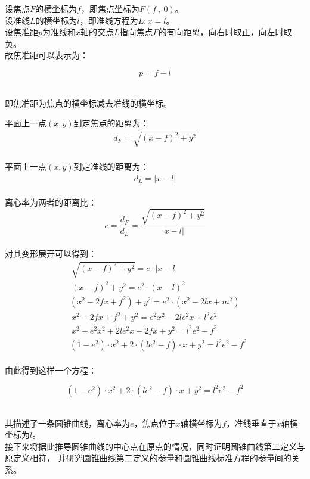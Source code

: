 \documentclass[UTF8]{ctexart}
\begin{document}
    设焦点$F$的横坐标为$f$，即焦点坐标为$F(f~,~0)$。\\[3mm]
    设准线$L$的横坐标为$l$\hspace{2.0pt}，即准线方程为$L:x=l$。\\[3mm]
    设焦准距$p$为准线和$x$轴的交点$L$指向焦点$F$的有向距离，向右时取正，向左时取负。\\[3mm]
    故焦准距可以表示为：
    \begin{large}
        \begin{equation*}
            p=f-l
        \end{equation*}
    \end{large}\\
    即焦准距为焦点的横坐标减去准线的横坐标。

\newpage

    平面上一点$(x,y)$到定焦点的距离为：
    \begin{align}
        d_F=\sqrt{(x-f)^2+y^2}
    \end{align}\\
    平面上一点$(x,y)$到定准线的距离为：
    \begin{align}
        d_L=|x-l|
    \end{align}\\
    离心率为两者的距离比：
    \begin{equation}
        e=\frac{d_F}{d_L}=\frac{\sqrt{(x-f)^2+y^2}}{|x-l|}
    \end{equation}\\[1mm]
    对其变形展开可以得到：
    \begin{align}
        &~\sqrt{(x-f)^2+y^2}=e\cdot|x-l|\\[7mm]
        &~(x-f)^2+y^2=e^2\cdot(x-l)^2\\[7mm]
        &\left(x^2-2fx+f^2\right)+y^2=e^2\cdot\left(x^2-2lx+m^2\right)\\[7mm]
        &~x^2-2fx+f^2+y^2=e^2x^2-2le^2x+l^2e^2\\[7mm]
        &~x^2-e^2x^2+2le^2x-2fx+y^2=l^2e^2-f^2\\[7mm]
        &\left(1-e^2\right)\cdot x^2+2\cdot\left(le^2-f\right)\cdot x+y^2=l^2e^2-f^2
    \end{align}\\
    由此得到这样一个方程：
    \begin{large}
        \begin{equation*}
            \left(1-e^2\right)\cdot x^2+2\cdot\left(le^2-f\right)\cdot x+y^2=l^2e^2-f^2
        \end{equation*}
    \end{large}\\
    其描述了一条圆锥曲线，离心率为$e$，焦点位于$x$轴横坐标为$f$，准线垂直于$x$轴横坐标为$l$。\\[3mm]
    接下来将据此推导圆锥曲线的中心点在原点的情况，同时证明圆锥曲线第二定义与原定义相符，
    并研究圆锥曲线第二定义的参量和圆锥曲线标准方程的参量间的关系。
\end{document}
